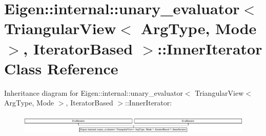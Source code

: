 \hypertarget{class_eigen_1_1internal_1_1unary__evaluator_3_01_triangular_view_3_01_arg_type_00_01_mode_01_4_0e8ca4efc3cb45e07bfa597fdc256f969}{}\section{Eigen\+:\+:internal\+:\+:unary\+\_\+evaluator$<$ Triangular\+View$<$ Arg\+Type, Mode $>$, Iterator\+Based $>$\+:\+:Inner\+Iterator Class Reference}
\label{class_eigen_1_1internal_1_1unary__evaluator_3_01_triangular_view_3_01_arg_type_00_01_mode_01_4_0e8ca4efc3cb45e07bfa597fdc256f969}
Inheritance diagram for Eigen\+:\+:internal\+:\+:unary\+\_\+evaluator$<$ Triangular\+View$<$ Arg\+Type, Mode $>$, Iterator\+Based $>$\+:\+:Inner\+Iterator\+:\begin{figure}[H]
\begin{center}
\leavevmode
\includegraphics[height=0.962199cm]{class_eigen_1_1internal_1_1unary__evaluator_3_01_triangular_view_3_01_arg_type_00_01_mode_01_4_0e8ca4efc3cb45e07bfa597fdc256f969}
\end{center}
\end{figure}

